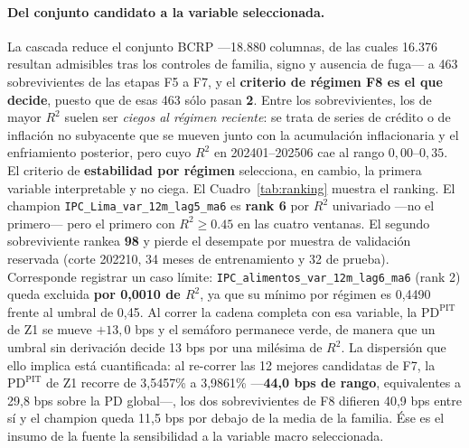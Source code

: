 \documentclass[12pt, a4paper]{article}
\newcommand{\PD}{\ensuremath{\mathrm{PD}}}
\newcommand{\PDPIT}{\ensuremath{\mathrm{PD}^{\mathrm{PIT}}}}
\begin{document}
\paragraph{Del conjunto candidato a la variable seleccionada.} La cascada reduce el conjunto BCRP
---18.880 columnas, de las cuales 16.376 resultan admisibles tras los controles de familia, signo y
ausencia de fuga--- a 463 sobrevivientes de las etapas F5 a F7, y el \textbf{criterio de régimen F8
es el que decide}, puesto que de esas 463 sólo pasan \textbf{2}. Entre los sobrevivientes, los de
mayor $R^2$ suelen ser \emph{ciegos al régimen reciente}: se trata de series de crédito o de
inflación no subyacente que se mueven junto con la acumulación inflacionaria y el enfriamiento
posterior, pero cuyo $R^2$ en 202401--202506 cae al rango $0{,}00$--$0{,}35$. El criterio de
\textbf{estabilidad por régimen} selecciona, en cambio, la primera variable interpretable y no
ciega. El
Cuadro~\ref{tab:ranking} muestra el ranking. El champion \texttt{IPC\_Lima\_var\_12m\_lag5\_ma6}
es \textbf{rank 6} por $R^2$ univariado ---no el primero--- pero el primero con $R^2\ge0.45$ en las
cuatro ventanas. El segundo sobreviviente rankea \textbf{98} y pierde el desempate por muestra de validación reservada
(corte 202210, 34 meses de entrenamiento y 32 de prueba). Corresponde registrar un caso límite:
\texttt{IPC\_alimentos\_var\_12m\_lag6\_ma6} (rank 2) queda excluida \textbf{por 0,0010 de $R^2$},
ya que su mínimo por régimen es 0,4490 frente al umbral de 0,45. Al correr la cadena completa con
esa variable, la \PDPIT{} de Z1 se mueve $+13{,}0$ bps y el semáforo permanece verde, de manera que
un umbral sin derivación decide 13 bps por una milésima de $R^2$. La dispersión que ello implica
está cuantificada: al re-correr las 12 mejores candidatas de F7, la \PDPIT{} de Z1 recorre de
3,5457\% a 3,9861\% ---\textbf{44,0 bps de rango}, equivalentes a 29,8 bps sobre la \PD{} global---,
los dos sobrevivientes de F8 difieren 40,9 bps entre sí y el champion queda 11,5 bps por debajo de
la media de la familia. Ése es el insumo de la fuente
la sensibilidad a la variable macro seleccionada.
\end{document}
